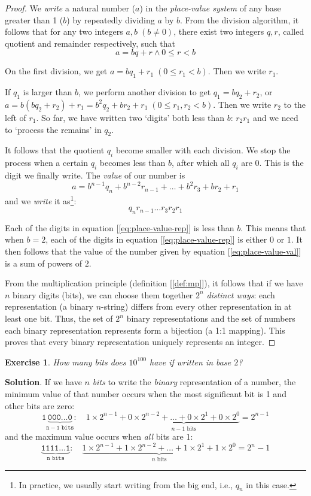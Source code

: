\documentclass[11pt]{book}
\theoremstyle{definition}
\theoremstyle{plain}
\newtheorem{exercise}{Exercise}
\theoremstyle{definition}
\theoremstyle{problemstyle}
\theoremstyle{remark}
\theoremstyle{definition}
\begin{document}
\begin{proof}
We \emph{write} a natural number ($a$) in the \emph{place-value system} of any base greater than 1 ($b$) by repeatedly dividing $a$ by $b$. From the division algorithm, it follows that for any two integers $a,b\;(b\ne0)$, there exist two integers $q, r$, called quotient and remainder respectively, such that
\[
    a=bq+r\land0\leq r<b
\]

On the first division, we get $a=bq_1+r_1\;(0\leq r_1<b)$. Then we write $r_1$.

If $q_1$ is larger than $b$, we perform another division to get $q_1=bq_2+r_2$, or $a=b(bq_2+r_2)+r_1=b^2q_2+br_2+r_1\;(0\leq r_1,r_2<b)$. Then we write $r_2$ to the left of $r_1$. So far, we have written two `digits' both less than $b$: $r_2r_1$ and we need to `process the remains' in $q_2$.

It follows that the quotient $q_i$ become smaller with each division. We stop the process when a certain $q_i$ becomes less than $b$, after which all $q_i$ are $0$. This is the digit we finally write. The \emph{value} of our number is
\begin{equation}
    \label{eq:place-value-val}
    a=b^{n-1}q_{n}+b^{n-2}r_{n-1}+\dots+b^2r_3+br_2+r_1
\end{equation}
and we \emph{write} it as\footnote{In practice, we usually start writing from the big end, i.e., $q_n$ in this case.}:
\begin{equation}
    \label{eq:place-value-rep}
    q_nr_{n-1}\dots r_3r_2r_1
\end{equation}

Each of the digits in equation [\ref{eq:place-value-rep}] is less than $b$. This means that when $b=2$, each of the digits in equation [\ref{eq:place-value-rep}] is either $0$ or $1$. It then follows that the value of the number given by equation [\ref{eq:place-value-val}] is a sum of powers of $2$.

    From the multiplication principle (definition [\ref{def:mp}]), it follows that if we have $n$ binary digits (bits), we can choose them together $2^n$ \emph{distinct ways}: each representation (a binary $n$-string) differs from every other representation in at least one bit. Thus, the set of $2^n$ binary representations and the set of numbers each binary representation represents form a bijection (a 1:1 mapping). This proves that every binary representation uniquely represents an integer.
\end{proof}
\begin{exercise}
    \label{ex:1.8.24}
    How many bits does $10^{100}$ have if written in base $2$?
\end{exercise}
\textbf{Solution}.
If we have $n$ \emph{bits} to write the \emph{binary} representation of a number, the minimum value of that number occurs when the most significant bit is 1 and other bits are zero:
\[
    \mathtt{1\underbrace{000\dots0}_{\text{$n-1$ bits}}}:\quad1\times2^{n-1}+\underbrace{0\times2^{n-2}+\dots+0\times2^1+0\times2^0}_{n-1\text{ bits}}=2^{n-1}
\]
and the maximum value occurs when \emph{all} bits are $1$:
\[
    \mathtt{\underbrace{1111\dots1}_{\text{$n$ bits}}}:\quad\underbrace{1\times2^{n-1}+1\times2^{n-2}+\dots+1\times2^1+1\times2^0}_{n\text{ bits}}=2^n-1
\]
\end{document}
